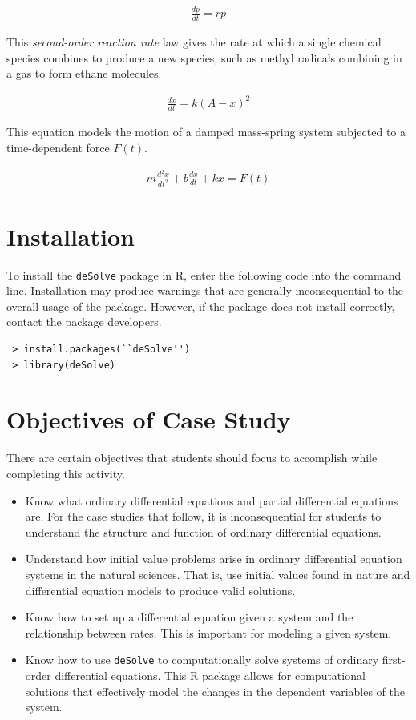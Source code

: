 \begin{gather*}
    \frac{dp}{dt}=rp
\end{gather*}

This \textit{second-order reaction rate} law gives the rate at which a single chemical species combines to produce a new species, such as methyl radicals combining in a gas to form ethane molecules.

\begin{gather*}
    \frac{dx}{dt}=k(A-x)^2
\end{gather*}

This equation models the motion of a damped mass-spring system subjected to a time-dependent force $F(t)$.

\begin{gather*}
    m\frac{d^2 x}{dt^2}+b\frac{dx}{dt}+kx=F(t)
\end{gather*}

\section{Installation}

To install the \texttt{deSolve} package in R, enter the following code into the command line.
Installation may produce warnings that are generally inconsequential to the overall usage of the package.
However, if the package does not install correctly, contact the package developers.

\begin{lstlisting}
 > install.packages(``deSolve'')
 > library(deSolve)
\end{lstlisting}

\section{Objectives of Case Study}

There are certain objectives that students should focus to accomplish while completing this activity. 

\begin{itemize}
\item Know what ordinary differential equations and partial differential equations are.
For the case studies that follow, it is inconsequential for students to understand the structure and function of ordinary differential equations.

\item Understand how initial value problems arise in ordinary differential equation systems in the natural sciences.
That is, use initial values found in nature and differential equation models to produce valid solutions.

\item Know how to set up a differential equation given a system and the relationship between rates.
This is important for modeling a given system.

\item Know how to use \texttt{deSolve} to computationally solve systems of ordinary first-order differential equations.
This R package allows for computational solutions that effectively model the changes in the dependent variables of the system.
\end{itemize}

